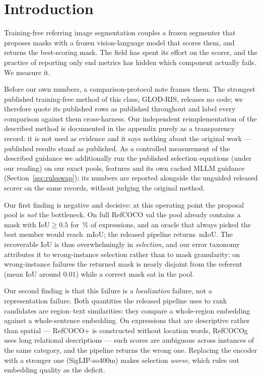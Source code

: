 \section{Introduction}
\label{sec:intro}

Training-free referring image segmentation couples a frozen segmenter that
proposes masks with a frozen vision-language model that scores them, and
returns the best-scoring mask. The field has spent its effort on the scorer,
and the practice of reporting only end metrics has hidden which component
actually fails. We measure it.

Before our own numbers, a comparison-protocol note frames them. The strongest
published training-free method of this class, GLOD-RIS, releases no code; we
therefore quote its published rows as published throughout and label every
comparison against them cross-harness. Our independent reimplementation of the
described method is documented in the appendix purely as a transparency record:
it is not used as evidence and it says nothing about the original work ---
published results stand as published. As a controlled measurement of the
described guidance we additionally run the published selection equations
(under our reading) on our exact pools, features and its own cached MLLM
guidance (Section~\ref{sec:ruleswap}); its numbers are reported alongside the
unguided released scorer on the same records, without judging the original
method.

Our first finding is negative and decisive: at this operating point the
proposal pool is \emph{not} the bottleneck. On full RefCOCO val the pool
already contains a mask with $\mathrm{IoU}\ge0.5$ for \oracleHitPct\,\% of
expressions, and an oracle that always picked the best member would reach
\oracleRefcoco\,mIoU; the released pipeline returns
\,mIoU. The recoverable IoU is thus overwhelmingly in
\emph{selection}, and our error taxonomy attributes it to wrong-instance
selection rather than to mask granularity: on wrong-instance failures the
returned mask is nearly disjoint from the referent (mean IoU around $0.01$)
while a correct mask sat in the pool.

Our second finding is that this failure is a \emph{localization} failure, not
a representation failure. Both quantities the released pipeline uses to rank
candidates are region--text similarities: they compare a whole-region
embedding against a whole-sentence embedding. On expressions that are
descriptive rather than spatial --- RefCOCO+ is constructed without location
words, RefCOCOg uses long relational descriptions --- such scores are
ambiguous across instances of the same category, and the pipeline returns the
wrong one. Replacing the encoder with a stronger one (SigLIP-so400m) makes
selection \emph{worse}, which rules out embedding quality as the deficit.

